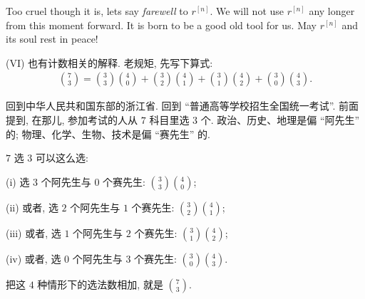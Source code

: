 \begin{remark}
    Too cruel though it is, let\apostrophe s say \textit{farewell} to $r^{[n]}$. We will not use $r^{[n]}$ any longer from this moment forward. It is born to be a good old tool for us. May $r^{[n]}$ and its soul rest in peace!
\end{remark}

\begin{example}
    (VI) 也有计数相关的解释. 老规矩, 先写下算式:
    \begin{align*}
        \binom{7}{3}
        = \binom{3}{3} \binom{4}{0}
        + \binom{3}{2} \binom{4}{1}
        + \binom{3}{1} \binom{4}{2}
        + \binom{3}{0} \binom{4}{3}.
    \end{align*}

    回到中华人民共和国东部的浙江省. 回到 ``普通高等学校招生全国统一考试''. 前面提到, 在那{\scriptsize 儿}, 参加考试的人从 $7$ 科目里选 $3$ 个. 政治、历史、地理是偏 ``阿先生''  的; 物理、化学、生物、技术是偏 ``赛先生''  的.

    $7$ 选 $3$ 可以这么选:

    (i) 选 $3$ 个阿先生与 $0$ 个赛先生: $\binom{3}{3} \binom{4}{0}$;

    (ii) 或者, 选 $2$ 个阿先生与 $1$ 个赛先生: $\binom{3}{2} \binom{4}{1}$;

    (iii) 或者, 选 $1$ 个阿先生与 $2$ 个赛先生: $\binom{3}{1} \binom{4}{2}$;

    (iv) 或者, 选 $0$ 个阿先生与 $3$ 个赛先生: $\binom{3}{0} \binom{4}{3}$.

    把这 $4$ 种情形下的选法数相加, 就是 $\binom{7}{3}$.
\end{example}
